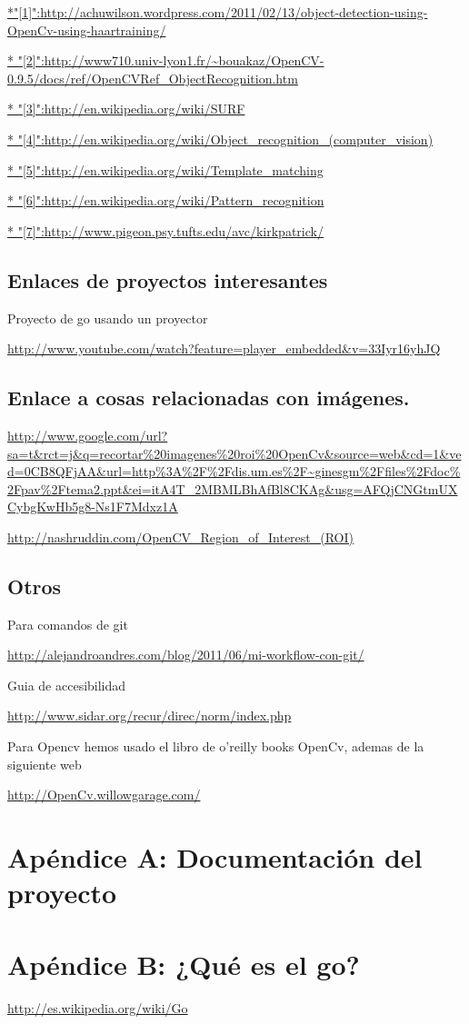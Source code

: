 \documentclass[12pt,a4paper]{report}
\begin{document}
\url{*"[1]":http://achuwilson.wordpress.com/2011/02/13/object-detection-using-OpenCv-using-haartraining/}

\url{*
"[2]":http://www710.univ-lyon1.fr/~bouakaz/OpenCV-0.9.5/docs/ref/OpenCVRef_ObjectRecognition.htm}

\url{* "[3]":http://en.wikipedia.org/wiki/SURF}

\url{* "[4]":http://en.wikipedia.org/wiki/Object_recognition_(computer_vision)}

\url{* "[5]":http://en.wikipedia.org/wiki/Template_matching}

\url{* "[6]":http://en.wikipedia.org/wiki/Pattern_recognition}

\url{* "[7]":http://www.pigeon.psy.tufts.edu/avc/kirkpatrick/}

\section{Enlaces de proyectos interesantes}

Proyecto de go usando un proyector

\url{http://www.youtube.com/watch?feature=player_embedded&v=33Iyr16yhJQ}


\section{Enlace a cosas relacionadas con imágenes.} 

\url{http://www.google.com/url?sa=t&rct=j&q=recortar%20imagenes%20roi%20OpenCv&source=web&cd=1&ved=0CB8QFjAA&url=http%3A%2F%2Fdis.um.es%2F~ginesgm%2Ffiles%2Fdoc%2Fpav%2Ftema2.ppt&ei=itA4T_2MBMLBhAfBl8CKAg&usg=AFQjCNGtmUXCybgKwHb5g8-Ns1F7Mdxz1A}

\url{http://nashruddin.com/OpenCV_Region_of_Interest_(ROI)}

\section{Otros}

Para comandos de git

\url{http://alejandroandres.com/blog/2011/06/mi-workflow-con-git/}

Guia de accesibilidad 

\url{http://www.sidar.org/recur/direc/norm/index.php}

Para Opencv hemos usado el libro de o'reilly books OpenCv, ademas de la
siguiente web

\url{http://OpenCv.willowgarage.com/}

\chapter{Apéndice A: Documentación del proyecto} 



\chapter{Apéndice B: ¿Qué es el go?} 
\url{http://es.wikipedia.org/wiki/Go}
\end{document}
